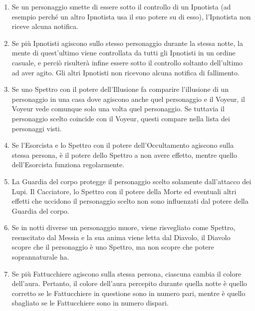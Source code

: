 \documentclass[a4paper,10pt]{article}
\begin{document}
\begin{enumerate}
 \item Se un personaggio smette di essere sotto il controllo di un Ipnotista (ad
esempio perché un altro Ipnotista usa il suo potere su di esso), l'Ipnotista non
riceve alcuna notifica.
 
 \item Se più Ipnotisti agiscono sullo stesso personaggio durante la stessa
notte, la mente di quest'ultimo viene controllata da tutti gli Ipnotisti in un
ordine casuale, e perciò risulterà infine essere sotto il controllo soltanto
dell'ultimo ad aver agito. Gli altri Ipnotisti non ricevono alcuna notifica di
fallimento.
 
 \item Se uno Spettro con il potere dell'Illusione fa comparire l'illusione di un
personaggio in una casa dove agiscono anche quel personaggio e il Voyeur, il
Voyeur vede comunque solo una volta quel personaggio. Se tuttavia il personaggio
scelto coincide con il Voyeur, questi compare nella lista dei personaggi visti.

 \item Se l'Esorcista e lo Spettro con il potere dell'Occultamento agiscono
sulla stessa persona, è il potere dello Spettro a non avere effetto, mentre
quello dell'Esorcista funziona regolarmente.
 
 \item La Guardia del corpo protegge il personaggio scelto solamente
dall'attacco dei Lupi. Il Cacciatore, lo Spettro con il potere della Morte ed
eventuali altri effetti che uccidono il personaggio scelto non sono influenzati
dal potere della Guardia del corpo.
 
 \item Se in notti diverse un personaggio muore, viene risvegliato come Spettro,
resuscitato dal Messia e la sua anima viene letta dal Diavolo, il Diavolo scopre
che il personaggio è uno Spettro, ma non scopre che potere soprannaturale ha.
 
 \item Se più Fattucchiere agiscono sulla stessa persona, ciascuna cambia il
colore dell'aura. Pertanto, il colore dell'aura percepito durante quella notte è
quello corretto se le Fattucchiere in questione sono in numero pari, mentre è
quello sbagliato se le Fattucchiere sono in numero dispari.
 

\end{enumerate}
\end{document}
